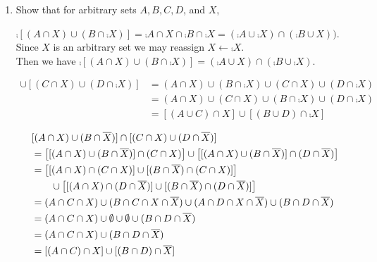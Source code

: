 \documentclass[12pt]{book}
\begin{document}
\begin{enumerate}
\item Show that for arbitrary sets $A, B, C, D$, and $X$,
\begin{enumerate}
{$\comp{[(A \cap X) \cup (B \cap \comp{X})]} = \comp{A \cap X} \cap \comp{B \cap \comp{X}} = (\comp{A} \cup \comp{X}) \cap (\comp{B} \cup X))$.\\Since $X$ is an arbitrary set we may reassign $X \leftarrow \comp{X}$.\\Then we have $\comp{[(A \cap X) \cup (B \cap \comp{X})]} = (\comp{A} \cup X) \cap (\comp{B} \cup \comp{X})$.}

{\begin{align*}[(A \cap X) \cup (B \cap \comp{X})] \cup [(C \cap X) \cup (D \cap \comp{X})] &= (A \cap X) \cup (B \cap \comp{X}) \cup (C \cap X) \cup (D \cap \comp{X})\\&= (A \cap X) \cup (C \cap X) \cup (B \cap \comp{X}) \cup (D \cap \comp{X})\\&= [(A \cup C) \cap X] \cup [(B \cup D) \cap \comp{X}]\end{align*}}

{\begin{align*}&[(A \cap X) \cup (B \cap \overline{X})] \cap [(C \cap X) \cup (D \cap \overline{X})]\\ &= \left[[(A \cap X) \cup (B \cap \overline{X})] \cap (C \cap X)\right] \cup \left[[(A \cap X) \cup (B \cap \overline{X})] \cap (D \cap \overline{X})\right]\\&= \left[[(A \cap X) \cap (C \cap X)] \cup [(B \cap \overline{X}) \cap (C \cap X)]\right]\\&\hspace{0.7cm}\cup \left[[(A \cap X) \cap (D \cap \overline{X})] \cup [(B \cap \overline{X}) \cap (D \cap \overline{X})]\right] \\&= (A \cap C \cap X) \cup (B \cap C \cap X \cap \overline{X}) \cup (A \cap D \cap X \cap \overline{X}) \cup (B \cap D \cap \overline{X})\\&= (A \cap C \cap X) \cup \emptyset \cup \emptyset \cup (B \cap D \cap \overline{X}) \\&= (A \cap C \cap X) \cup (B \cap D \cap \overline{X}) \\&= [(A \cap C) \cap X] \cup [(B \cap D) \cap \overline{X}] \end{align*}}
\end{enumerate}


\end{enumerate}
\end{document}
